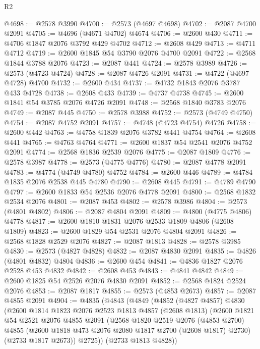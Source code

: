 \begin{lexlean}{R2}
\begin{coremodule}
@4698 := @2578 @3990
@4700 := @2573 (@4697 @4698)
@4702 := @2087 @4700 @2091
@4705 := @4696 (@4671 @4702) @4674
@4706 := @2600 @430
@4711 := @4706 @1847 @2076 @3792 @429 @4702
@4712 := @2608 @429
@4713 := @4711 @4712
@4719 := @2600 @1845 @54 @3790 @2076 @4700 @2091
@4722 := @2568 @1844 @3788 @2076
@4723 := @2087 @441
@4724 := @2578 @3989
@4726 := @2573 (@4723 @4724)
@4728 := @2087 @4726 @2091
@4731 := @4722 (@4697 @4728) @4700
@4732 := @2600 @434
@4737 := @4732 @1843 @2076 @3787 @433 @4728
@4738 := @2608 @433
@4739 := @4737 @4738
@4745 := @2600 @1841 @54 @3785 @2076 @4726 @2091
@4748 := @2568 @1840 @3783 @2076
@4749 := @2087 @445
@4750 := @2578 @3988
@4752 := @2573 (@4749 @4750)
@4754 := @2087 @4752 @2091
@4757 := @4748 (@4723 @4754) @4726
@4758 := @2600 @442
@4763 := @4758 @1839 @2076 @3782 @441 @4754
@4764 := @2608 @441
@4765 := @4763 @4764
@4771 := @2600 @1837 @54 @2541 @2076 @4752 @2091
@4774 := @2568 @1836 @2539 @2076
@4775 := @2087 @1809
@4776 := @2578 @3987
@4778 := @2573 (@4775 @4776)
@4780 := @2087 @4778 @2091
@4783 := @4774 (@4749 @4780) @4752
@4784 := @2600 @446
@4789 := @4784 @1835 @2076 @2538 @445 @4780
@4790 := @2608 @445
@4791 := @4789 @4790
@4797 := @2600 @1833 @54 @2536 @2076 @4778 @2091
@4800 := @2568 @1832 @2534 @2076
@4801 := @2087 @453
@4802 := @2578 @3986
@4804 := @2573 (@4801 @4802)
@4806 := @2087 @4804 @2091
@4809 := @4800 (@4775 @4806) @4778
@4817 := @2600 @1810 @1831 @2076 @2533 @1809 @4806 (@2608 @1809)
@4823 := @2600 @1829 @54 @2531 @2076 @4804 @2091
@4826 := @2568 @1828 @2529 @2076
@4827 := @2087 @1813
@4828 := @2578 @3985
@4830 := @2573 (@4827 @4828)
@4832 := @2087 @4830 @2091
@4835 := @4826 (@4801 @4832) @4804
@4836 := @2600 @454
@4841 := @4836 @1827 @2076 @2528 @453 @4832
@4842 := @2608 @453
@4843 := @4841 @4842
@4849 := @2600 @1825 @54 @2526 @2076 @4830 @2091
@4852 := @2568 @1824 @2524 @2076
@4853 := @2087 @1817
@4855 := @2573 (@4853 @2673)
@4857 := @2087 @4855 @2091
@4904 := @4835
    (@4843
      (@4849
        (@4852
          (@4827 @4857)
          @4830
          (@2600
            @1814
            @1823
            @2076
            @2523
            @1813
            @4857
            (@2608 @1813)
            (@2600
              @1821
              @54
              @2521
              @2076
              @4855
              @2091
              (@2568
                @1820
                @2519
                @2076
                (@4853 @2700)
                @4855
                (@2600 @1818 @473 @2076 @2080 @1817 @2700 (@2608 @1817) @2730)
                (@2733 @1817 @2673))
              @2725))
          (@2733 @1813 @4828))

\end{coremodule}
\end{lexlean}
